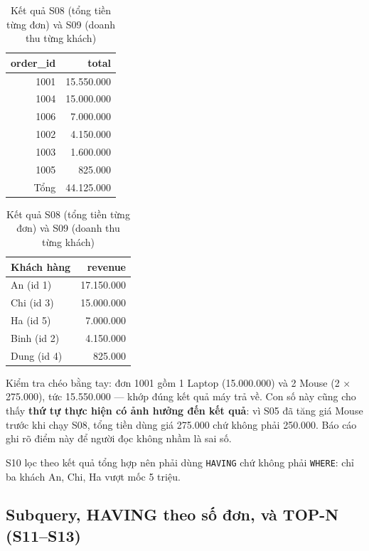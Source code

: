 \documentclass[12pt,a4paper]{article}
\newcommand{\code}[1]{\texttt{\small #1}}
\begin{document}
\begin{table}[H]
\centering
\caption{Kết quả S08 (tổng tiền từng đơn) và S09 (doanh thu từng khách)}
\label{tab:s08s09}
\small
\begin{minipage}[t]{0.47\linewidth}
\centering
\begin{tabular}{@{}r r@{}}
\toprule
\textbf{order\_id} & \textbf{total} \\
\midrule
1001 & 15.550.000 \\
1004 & 15.000.000 \\
1006 &  7.000.000 \\
1002 &  4.150.000 \\
1003 &  1.600.000 \\
1005 &    825.000 \\
\midrule
Tổng & 44.125.000 \\
\bottomrule
\end{tabular}
\end{minipage}\hfill
\begin{minipage}[t]{0.47\linewidth}
\centering
\begin{tabular}{@{}l r@{}}
\toprule
\textbf{Khách hàng} & \textbf{revenue} \\
\midrule
An (id 1)   & 17.150.000 \\
Chi (id 3)  & 15.000.000 \\
Ha (id 5)   &  7.000.000 \\
Binh (id 2) &  4.150.000 \\
Dung (id 4) &    825.000 \\
\bottomrule
\end{tabular}
\end{minipage}
\end{table}

Kiểm tra chéo bằng tay: đơn 1001 gồm 1 Laptop (15.000.000) và 2 Mouse (2 $\times$ 275.000), tức
15.550.000 --- khớp đúng kết quả máy trả về. Con số này cũng cho thấy \textbf{thứ tự thực hiện có
ảnh hưởng đến kết quả}: vì S05 đã tăng giá Mouse trước khi chạy S08, tổng tiền dùng giá
275.000 chứ không phải 250.000. Báo cáo ghi rõ điểm này để người đọc không nhầm là sai số.

S10 lọc theo kết quả tổng hợp nên phải dùng \code{HAVING} chứ không phải \code{WHERE}: chỉ ba
khách An, Chi, Ha vượt mốc 5 triệu.

\subsection{Subquery, HAVING theo số đơn, và TOP-N (S11--S13)}
\end{document}
